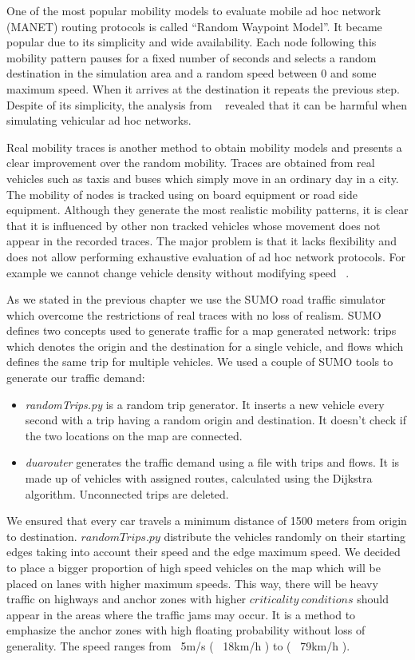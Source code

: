One of the most popular mobility models to evaluate mobile ad hoc network
(MANET) routing protocols is called ``Random Waypoint Model''. It became popular
due to its simplicity and wide availability. Each node following this mobility
pattern pauses for a fixed number of seconds and selects a random destination
in the simulation area and a random speed between 0 and some maximum speed. When
it arrives at the destination it repeats the previous step. Despite of its
simplicity, the analysis from ~\cite{yoon2003random} revealed that it can be
harmful when simulating vehicular ad hoc networks.

Real mobility traces is another method to obtain mobility models and presents a
clear improvement over the random mobility. Traces are obtained from real
vehicles such as taxis and buses which simply move in an ordinary day in a city.
The mobility of nodes is tracked using on board equipment or road side
equipment. Although they generate the most realistic mobility patterns, it is
clear that it is influenced by other non tracked vehicles whose movement does
not appear in the recorded traces. The major problem is that it lacks
flexibility and does not allow performing exhaustive evaluation of ad hoc
network protocols. For example we cannot change vehicle density without
modifying speed ~\cite{baguena2013vacamobil}.

As we stated in the previous chapter we use the SUMO road traffic simulator
which overcome the restrictions of real traces with no loss of realism. SUMO
defines two concepts used to generate traffic for a map generated network: trips
which denotes the origin and the destination for a single vehicle, and flows
which defines the same trip for multiple vehicles. We used a couple of SUMO
tools to generate our traffic demand:

\begin{itemize}
  \item {\it randomTrips.py} is a random trip generator. It inserts a
  new vehicle every second with a trip having a random origin and destination.
  It doesn't check if the two locations on the map are connected.
  \item {\it duarouter} generates the traffic demand using a file with trips and
  flows. It is made up of vehicles with assigned routes, calculated using the
  Dijkstra algorithm. Unconnected trips are deleted.
\end{itemize}

We ensured that every car travels a minimum distance of 1500 meters from origin
to destination. $randomTrips.py$ distribute the vehicles randomly on their
starting edges taking into account their speed and the edge maximum speed. We
decided to place a bigger proportion of high speed vehicles on the map which
will be placed on lanes with higher maximum speeds. This way, there will
be heavy traffic on highways and anchor zones with higher $criticality\ 
conditions$ should appear in the areas where the traffic jams may occur. It is a
method to emphasize the anchor zones with high floating probability without loss of
generality. The speed ranges from ~5m/s ( ~18km/h ) to ( ~79km/h ).

